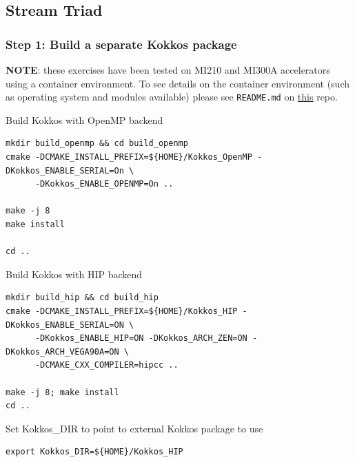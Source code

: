 \documentclass[
]{article}
\let\oldtexttt\texttt
\renewcommand{\texttt}[1]{
  \colorbox{Light}{\oldtexttt{#1}}
}
\newenvironment{Shaded}{}{}
\newcommand{\BuiltInTok}[1]{#1}
\newcommand{\FunctionTok}[1]{\textcolor[rgb]{0.02,0.16,0.49}{#1}}
\newcommand{\NormalTok}[1]{#1}
\newcommand{\VariableTok}[1]{\textcolor[rgb]{0.10,0.09,0.49}{#1}}
\begin{document}
\hypertarget{stream-triad}{%
\subsection{Stream Triad}\label{stream-triad}}

\hypertarget{step-1-build-a-separate-kokkos-package}{%
\subsubsection{Step 1: Build a separate Kokkos
package}\label{step-1-build-a-separate-kokkos-package}}

\textbf{NOTE}: these exercises have been tested on MI210 and MI300A
accelerators using a container environment. To see details on the
container environment (such as operating system and modules available)
please see \texttt{README.md} on
\href{https://github.com/amd/HPCTrainingDock}{this} repo.

\begin{Shaded}
\end{Shaded}

Build Kokkos with OpenMP backend

\begin{verbatim}
mkdir build_openmp && cd build_openmp
cmake -DCMAKE_INSTALL_PREFIX=${HOME}/Kokkos_OpenMP -DKokkos_ENABLE_SERIAL=On \
      -DKokkos_ENABLE_OPENMP=On ..

make -j 8
make install

cd ..
\end{verbatim}

Build Kokkos with HIP backend

\begin{verbatim}
mkdir build_hip && cd build_hip
cmake -DCMAKE_INSTALL_PREFIX=${HOME}/Kokkos_HIP -DKokkos_ENABLE_SERIAL=ON \
      -DKokkos_ENABLE_HIP=ON -DKokkos_ARCH_ZEN=ON -DKokkos_ARCH_VEGA90A=ON \
      -DCMAKE_CXX_COMPILER=hipcc ..

make -j 8; make install
cd ..
\end{verbatim}

Set Kokkos\_DIR to point to external Kokkos package to use

\begin{verbatim}
export Kokkos_DIR=${HOME}/Kokkos_HIP
\end{verbatim}
\end{document}
